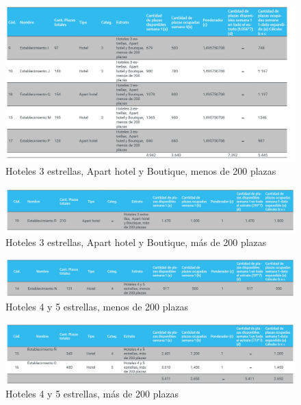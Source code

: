 \documentclass[
]{book}
\begin{document}
\begin{figure}

{\centering \includegraphics[width=0.8\linewidth]{imagenes/hoteles3_estrellas_apart_boutique_menos_200_plazas} 

}

\caption{Hoteles 3 estrellas,  Apart hotel y Boutique, menos de 200 plazas}\label{fig:3-estrellas}
\end{figure}

\begin{figure}

{\centering \includegraphics[width=0.8\linewidth]{imagenes/hoteles3_estrellas_apart_boutique_mas_200_plazas} 

}

\caption{Hoteles 3 estrellas,  Apart hotel y Boutique, más de 200 plazas}\label{fig:3-estrellas-mas200}
\end{figure}

\begin{figure}

{\centering \includegraphics[width=0.8\linewidth]{imagenes/hoteles4_5_estrellas_menos_200_plazas} 

}

\caption{Hoteles 4 y 5 estrellas, menos de 200 plazas}\label{fig:4-5-estrellas-menos200}
\end{figure}

\begin{figure}

{\centering \includegraphics[width=0.8\linewidth]{imagenes/hoteles4_5_estrellas_mas_200_plazas} 

}

\caption{Hoteles 4 y 5 estrellas, más de 200 plazas}\label{fig:4-5-estrellas-mas200}
\end{figure}
\end{document}
